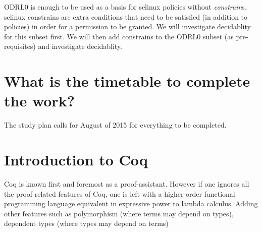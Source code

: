 ODRL0 is enough to be used as a basis for \ac{selinux} policies without \emph{constrain}s. \ac{selinux} constrains are extra  conditions that need to be satisfied (in addition to policies) in order for a permission to be granted. We will investigate decidablity for this subset first. We will then add constrains to the ODRL0 subset (as pre-requisites) and investigate decidablity.



\section{What is the timetable to complete the work?}

The study plan calls for August of 2015 for everything to be completed.


\section{Introduction to Coq}

Coq is known first and foremost as a proof-assistant. However if one ignores all the proof-related features of Coq, one is left with a higher-order functional programming language equivalent in expressive power to lambda calculus. Adding other features such as polymorphism (where terms may depend on types), dependent types (where types may depend on terms) 








